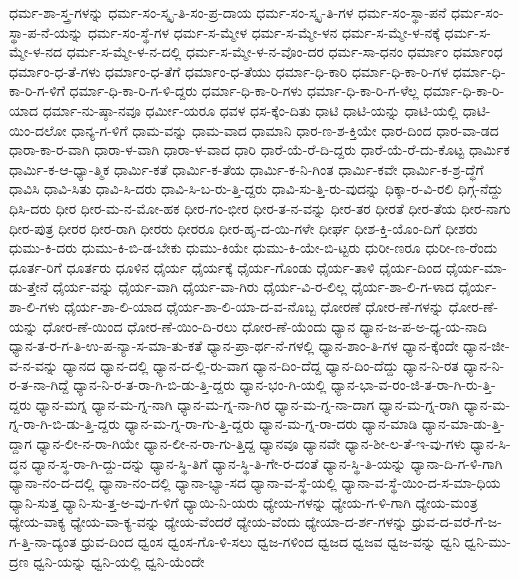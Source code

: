 {ಧರ್ಮ-ಶಾ-ಸ್ತ್ರ-ಗಳನ್ನು
ಧರ್ಮ-ಸಂ-ಸ್ಕೃ-ತಿ-ಸಂ-ಪ್ರ-ದಾಯ
ಧರ್ಮ-ಸಂ-ಸ್ಕೃ-ತಿ-ಗಳ
ಧರ್ಮ-ಸಂ-ಸ್ಥಾ-ಪನೆ
ಧರ್ಮ-ಸಂ-ಸ್ಥಾ-ಪ-ನೆ-ಯನ್ನು
ಧರ್ಮ-ಸಂ-ಸ್ಥೆ-ಗಳ
ಧರ್ಮ-ಸ-ಮ್ಮೇಳ
ಧರ್ಮ-ಸ-ಮ್ಮೇ-ಳನ
ಧರ್ಮ-ಸ-ಮ್ಮೇ-ಳ-ನಕ್ಕೆ
ಧರ್ಮ-ಸ-ಮ್ಮೇ-ಳ-ನದ
ಧರ್ಮ-ಸ-ಮ್ಮೇ-ಳ-ನ-ದಲ್ಲಿ
ಧರ್ಮ-ಸ-ಮ್ಮೇ-ಳ-ನ-ವೊಂ-ದರ
ಧರ್ಮ-ಸಾ-ಧನಂ
ಧರ್ಮಾಂ
ಧರ್ಮಾಂಧ
ಧರ್ಮಾಂ-ಧ-ತೆ-ಗಳು
ಧರ್ಮಾಂ-ಧ-ತೆಗೆ
ಧರ್ಮಾಂ-ಧ-ತೆಯು
ಧರ್ಮಾ-ಧಿ-ಕಾರಿ
ಧರ್ಮಾ-ಧಿ-ಕಾ-ರಿ-ಗಳ
ಧರ್ಮಾ-ಧಿ-ಕಾ-ರಿ-ಗ-ಳಿಗೆ
ಧರ್ಮಾ-ಧಿ-ಕಾ-ರಿ-ಗ-ಳಿ-ದ್ದರು
ಧರ್ಮಾ-ಧಿ-ಕಾ-ರಿ-ಗಳು
ಧರ್ಮಾ-ಧಿ-ಕಾ-ರಿ-ಗ-ಳೆಲ್ಲ
ಧರ್ಮಾ-ಧಿ-ಕಾ-ರಿ-ಯಾದ
ಧರ್ಮಾ-ನು-ಷ್ಠಾ-ನವೂ
ಧರ್ಮೀ-ಯರೂ
ಧವಳ
ಧಸ-ಕ್ಕೆಂ-ದಿತು
ಧಾಟಿ
ಧಾಟಿ-ಯನ್ನು
ಧಾಟಿ-ಯಲ್ಲಿ
ಧಾಟಿ-ಯಿಂ-ದಲೋ
ಧಾನ್ಯ-ಗ-ಳಿಗೆ
ಧಾಮ-ವನ್ನು
ಧಾಮ-ವಾದ
ಧಾಮಾನಿ
ಧಾರ-ಣ-ಶ-ಕ್ತಿಯೇ
ಧಾರ-ದಿಂದ
ಧಾರ-ವಾ-ಡದ
ಧಾರಾ-ಕಾ-ರ-ವಾಗಿ
ಧಾರಾ-ಳ-ವಾಗಿ
ಧಾರಾ-ಳ-ವಾದ
ಧಾರಿ
ಧಾರೆ-ಯೆ-ರೆ-ದಿ-ದ್ದರು
ಧಾರೆ-ಯೆ-ರೆ-ದು-ಕೊಟ್ಟ
ಧಾರ್ಮಿಕ
ಧಾರ್ಮಿ-ಕ-ಆ-ಧ್ಯಾ-ತ್ಮಿಕ
ಧಾರ್ಮಿ-ಕತೆ
ಧಾರ್ಮಿ-ಕ-ತೆಯ
ಧಾರ್ಮಿ-ಕ-ನಿ-ಗಿಂತ
ಧಾರ್ಮಿ-ಕವೇ
ಧಾರ್ಮಿ-ಕ-ಶ್ರ-ದ್ಧೆಗೆ
ಧಾವಿಸಿ
ಧಾವಿ-ಸಿತು
ಧಾವಿ-ಸಿ-ದರು
ಧಾವಿ-ಸಿ-ಬ-ರು-ತ್ತಿ-ದ್ದರು
ಧಾವಿ-ಸು-ತ್ತಿ-ರು-ವುದನ್ನು
ಧಿಕ್ಕಾ-ರ-ವಿ-ರಲಿ
ಧಿಗ್ಗ-ನೆದ್ದು
ಧಿಸಿ-ದರು
ಧೀರ
ಧೀರ-ಮ-ನ-ಮೋ-ಹಕ
ಧೀರ-ಗಂ-ಭೀರ
ಧೀರ-ತ-ನ-ವನ್ನು
ಧೀರ-ತರ
ಧೀರತೆ
ಧೀರ-ತೆಯ
ಧೀರ-ನಾಗು
ಧೀರ-ಪುತ್ರ
ಧೀರರ
ಧೀರ-ರಾಗಿ
ಧೀರರು
ಧೀರರೂ
ಧೀರ-ಹೃ-ದ-ಯಿ-ಗಳೇ
ಧೀರ್ಘ
ಧೀಶ-ಕ್ತಿ-ಯೊಂ-ದಿಗೆ
ಧೀಶರು
ಧುಮು-ಕಿ-ದರು
ಧುಮು-ಕಿ-ಬಿ-ಡ-ಬೇಕು
ಧುಮು-ಕಿಯೇ
ಧುಮು-ಕಿ-ಯೇ-ಬಿ-ಟ್ಟರು
ಧುರೀ-ಣರೂ
ಧುರೀ-ಣ-ರೆಂದು
ಧೂರ್ತ-ರಿಗೆ
ಧೂರ್ತರು
ಧೂಳಿನ
ಧೈರ್ಯ
ಧೈರ್ಯಕ್ಕೆ
ಧೈರ್ಯ-ಗೊಂಡು
ಧೈರ್ಯ-ತಾಳಿ
ಧೈರ್ಯ-ದಿಂದ
ಧೈರ್ಯ-ಮಾ-ಡು-ತ್ತೇನೆ
ಧೈರ್ಯ-ವನ್ನು
ಧೈರ್ಯ-ವಾಗಿ
ಧೈರ್ಯ-ವಾ-ಗಿರು
ಧೈರ್ಯ-ವಿ-ರ-ಲಿಲ್ಲ
ಧೈರ್ಯ-ಶಾ-ಲಿ-ಗ-ಳಾದ
ಧೈರ್ಯ-ಶಾ-ಲಿ-ಗಳು
ಧೈರ್ಯ-ಶಾ-ಲಿ-ಯಾದ
ಧೈರ್ಯ-ಶಾ-ಲಿ-ಯಾ-ದ-ವ-ನೊಬ್ಬ
ಧೋರಣೆ
ಧೋರ-ಣೆ-ಗಳನ್ನು
ಧೋರ-ಣೆ-ಯನ್ನು
ಧೋರ-ಣೆ-ಯಿಂದ
ಧೋರ-ಣೆ-ಯಿಂ-ದಿ-ರಲು
ಧೋರ-ಣೆ-ಯೆಂದು
ಧ್ಯಾನ
ಧ್ಯಾನ-ಜ-ಪ-ಅ-ಧ್ಯ-ಯ-ನಾದಿ
ಧ್ಯಾನ-ತ-ರ-ಗ-ತಿ-ಉ-ಪ-ನ್ಯಾ-ಸ-ಮಾ-ತು-ಕತೆ
ಧ್ಯಾನ-ಪ್ರಾ-ರ್ಥ-ನೆ-ಗಳಲ್ಲಿ
ಧ್ಯಾನ-ಶಾಂ-ತಿ-ಗಳ
ಧ್ಯಾನ-ಕ್ಕೆಂದೇ
ಧ್ಯಾನ-ಜೀ-ವ-ನ-ವನ್ನು
ಧ್ಯಾನದ
ಧ್ಯಾನ-ದಲ್ಲಿ
ಧ್ಯಾನ-ದ-ಲ್ಲಿ-ರು-ವಾಗ
ಧ್ಯಾನ-ದಿಂ-ದೆದ್ದ
ಧ್ಯಾನ-ದಿಂ-ದೆದ್ದು
ಧ್ಯಾನ-ನಿ-ರತ
ಧ್ಯಾನ-ನಿ-ರ-ತ-ನಾ-ಗಿದ್ದೆ
ಧ್ಯಾನ-ನಿ-ರ-ತ-ರಾ-ಗಿ-ಬಿ-ಡು-ತ್ತಿ-ದ್ದರು
ಧ್ಯಾನ-ಭಂ-ಗಿ-ಯಲ್ಲಿ
ಧ್ಯಾನ-ಭಾ-ವ-ರಂ-ಜಿ-ತ-ರಾ-ಗಿ-ರು-ತ್ತಿ-ದ್ದರು
ಧ್ಯಾನ-ಮಗ್ನ
ಧ್ಯಾನ-ಮ-ಗ್ನ-ನಾಗಿ
ಧ್ಯಾನ-ಮ-ಗ್ನ-ನಾ-ಗಿರ
ಧ್ಯಾನ-ಮ-ಗ್ನ-ನಾ-ದಾಗ
ಧ್ಯಾನ-ಮ-ಗ್ನ-ರಾಗಿ
ಧ್ಯಾನ-ಮ-ಗ್ನ-ರಾ-ಗಿ-ಬಿ-ಡು-ತ್ತಿ-ದ್ದರು
ಧ್ಯಾನ-ಮ-ಗ್ನ-ರಾ-ಗು-ತ್ತಿ-ದ್ದರು
ಧ್ಯಾನ-ಮ-ಗ್ನ-ರಾ-ದರು
ಧ್ಯಾನ-ಮಾಡಿ
ಧ್ಯಾನ-ಮಾ-ಡು-ತ್ತಿ-ದ್ದಾಗ
ಧ್ಯಾನ-ಲೀ-ನ-ರಾ-ಗಿಯೇ
ಧ್ಯಾನ-ಲೀ-ನ-ರಾ-ಗು-ತ್ತಿದ್ದ
ಧ್ಯಾನವೂ
ಧ್ಯಾನವೇ
ಧ್ಯಾನ-ಶೀ-ಲ-ತೆ-ಇ-ವು-ಗಳು
ಧ್ಯಾನ-ಸಿ-ದ್ಧನ
ಧ್ಯಾನ-ಸ್ಥ-ರಾ-ಗಿ-ದ್ದು-ದನ್ನು
ಧ್ಯಾನ-ಸ್ಥಿ-ತಿಗೆ
ಧ್ಯಾನ-ಸ್ಥಿ-ತಿ-ಗೇ-ರ-ದಂತೆ
ಧ್ಯಾನ-ಸ್ಥಿ-ತಿ-ಯನ್ನು
ಧ್ಯಾನಾ-ದಿ-ಗ-ಳಿ-ಗಾಗಿ
ಧ್ಯಾನಾ-ನಂ-ದ-ದಲ್ಲಿ
ಧ್ಯಾನಾ-ನಂ-ದಲ್ಲಿ
ಧ್ಯಾನಾ-ಭ್ಯಾ-ಸದ
ಧ್ಯಾನಾ-ವ-ಸ್ಥೆ-ಯಲ್ಲಿ
ಧ್ಯಾನಾ-ವ-ಸ್ಥೆ-ಯಿಂ-ದ-ಸ-ಮಾ-ಧಿಯ
ಧ್ಯಾನಿ-ಸುತ್ತ
ಧ್ಯಾನಿ-ಸು-ತ್ತ-ಅ-ವು-ಗ-ಳಿಗೆ
ಧ್ಯಾಯಿ-ನಿ-ಯರು
ಧ್ಯೇಯ-ಗಳನ್ನು
ಧ್ಯೇಯ-ಗ-ಳಿ-ಗಾಗಿ
ಧ್ಯೇಯ-ಮಂತ್ರ
ಧ್ಯೇಯ-ವಾಕ್ಯ
ಧ್ಯೇಯ-ವಾ-ಕ್ಯ-ವನ್ನು
ಧ್ಯೇಯ-ವೆಂದರೆ
ಧ್ಯೇಯ-ವೆಂದು
ಧ್ಯೇಯಾ-ದ-ರ್ಶ-ಗಳನ್ನು
ಧ್ರುವ-ದ-ವರೆ-ಗೆ-ಜ-ಗ-ತ್ತಿ-ನಾ-ದ್ಯಂತ
ಧ್ರುವ-ದಿಂದ
ಧ್ವಂಸ
ಧ್ವಂಸ-ಗೊ-ಳಿ-ಸಲು
ಧ್ವಜ-ಗಳಿಂದ
ಧ್ವಜದ
ಧ್ವಜವ
ಧ್ವಜ-ವನ್ನು
ಧ್ವನಿ
ಧ್ವನಿ-ಮು-ದ್ರಣ
ಧ್ವನಿ-ಯನ್ನು
ಧ್ವನಿ-ಯಲ್ಲಿ
ಧ್ವನಿ-ಯೆಂದೇ
}
